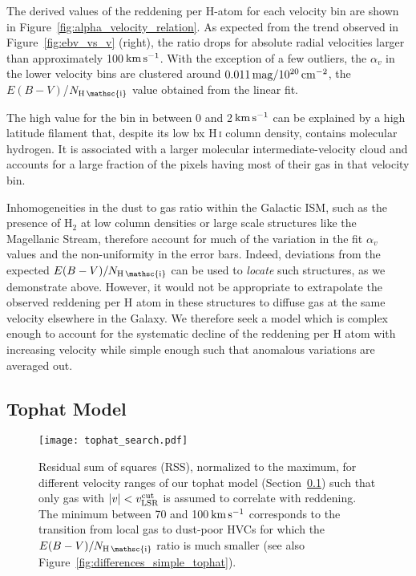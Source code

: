 \documentclass[iop,apj]{emulateapj}
\makeatletter
\def\testbx{bx}%
\DeclareRobustCommand{\ion}[2]{%
\relax\ifmmode
\ifx\testbx\f@series
{\mathbf{#1\,\mathsc{#2}}}\else
{\mathrm{#1\,\mathsc{#2}}}\fi
\else\textup{#1\,{\mdseries\textsc{#2}}}%
\fi}
\makeatother
\begin{document}
The derived values of the reddening per H-atom for each velocity bin are shown in Figure~\ref{fig:alpha_velocity_relation}. As expected from the trend observed in Figure~\ref{fig:ebv_vs_v} (right), the ratio drops for absolute radial velocities larger than approximately 100$\,\rm km\,s^{-1}$. With the exception of a few outliers, the $\alpha_v$ in the lower velocity bins are clustered around $0.011\,\rm mag/10^{20}\,cm^{-2}$, the $E(B-V)$/$N_\ion{H}{i}$ value obtained from the linear fit.

The high value for the bin in between 0 and 2$\,\rm km\,s^{-1}$ can be explained by a high latitude filament that, despite its low \ion{H}{i} column density, contains molecular hydrogen. It is associated with a larger molecular intermediate-velocity cloud \citep{Magnani+Smith_2010, Roehser+etal_2016} and accounts for a large fraction of the pixels having most of their gas in that velocity bin.

Inhomogeneities in the dust to gas ratio within the Galactic ISM, such as the presence of H$_2$ at low column densities or large scale structures like the Magellanic Stream, therefore account for much of the variation in the fit $\alpha_v$ values and the non-uniformity in the error bars. Indeed, deviations from the expected $E(B-V)/N_\ion{H}{i}$ can be used to {\it locate} such structures, as we demonstrate above. However, it would not be appropriate to extrapolate the observed reddening per H atom in these structures to diffuse gas at the same velocity elsewhere in the Galaxy. We therefore seek a model which is complex enough to account for the systematic decline of the reddening per H atom with increasing velocity while simple enough such that anomalous variations are averaged out.

\subsection{Tophat Model}
\label{subsec:tophat}
\begin{figure}[tp]
	\texttt{[image: tophat\_search.pdf]}
    \caption{Residual sum of squares (RSS), normalized to the maximum, for different velocity ranges of our tophat model (Section~\ref{subsec:tophat}) such that only gas with $|v| < v_{\rm LSR}^{\rm cut}$ is assumed to correlate with reddening. The minimum between 70 and 100\,$\rm km\,s^{-1}$ corresponds to the transition from local gas to dust-poor HVCs for which the $E(B-V)/N_{\ion{H}{i}}$ ratio is much smaller (see also Figure~\ref{fig:differences_simple_tophat}).}
	\label{fig:tophat_search}
\end{figure}
\end{document}
